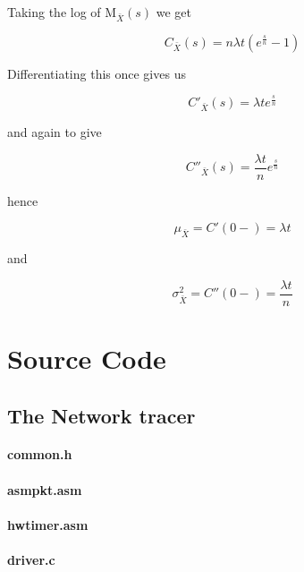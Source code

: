 Taking the log of $\mbox{M}_{\bar X}(s)$ we get

\[
C_{\bar X}(s) = n \lambda t(e^\frac{s}{n} - 1)
\]

Differentiating this once gives us 

\[
C'_{\bar X}(s) = \lambda t e^\frac{s}{n}
\]

and again to give

\[
C''_{\bar X}(s)  =  \frac{\lambda t}{n} e^\frac{s}{n}
\]

hence

\[
\mu_{\bar X} = C'(0-) = \lambda t
\]

and

\[
\sigma^2_{\bar X} = C''(0-) = \frac{\lambda t}{n}
\]

\chapter{Source Code}
\label{code}

\renewcommand{\baselinestretch}{1.0}

\section{The Network tracer}

\subsubsection{common.h}

\begin{scriptsize}

\end{scriptsize}

\subsubsection{asmpkt.asm}

\begin{scriptsize}

\end{scriptsize}

\subsubsection{hwtimer.asm}

\begin{scriptsize}

\end{scriptsize}

\subsubsection{driver.c}


